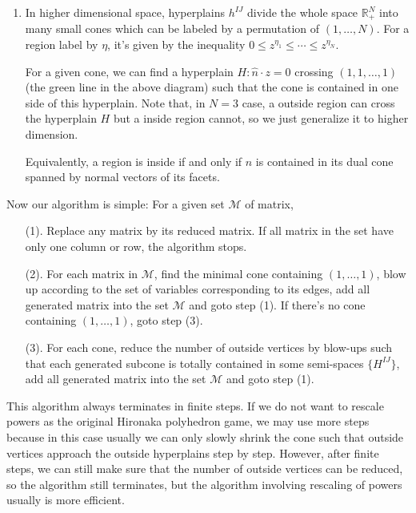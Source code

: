 \documentclass[12pt]{article}
\theoremstyle{definition}
\theoremstyle{plain}
\begin{document}
\begin{enumerate}
\item In higher dimensional space, hyperplains $h^{IJ}$ divide the whole space $\mathbb R_+^N$
	into many small cones which can be labeled by a permutation of $(1,\dots,N)$. 
	For a region label by $\eta$, it's given by the inequality 
	$0\leq z^{\eta_1}\leq \cdots\leq z^{\eta_N}$. 
	
	For a given cone, we can find a hyperplain $H:\hat{n}\cdot z=0$ crossing
	$(1,1,\dots,1)$ (the green line in the above diagram) 
	such that the cone is contained in one side of this hyperplain.
	Note that, in $N=3$ case, a outside region can cross the hyperplain $H$ 
	but a inside region cannot, so we just generalize it to higher dimension.

	Equivalently, a region is inside if and only if $\hat{n}$ is contained in 
	its dual cone spanned by normal vectors of its facets.
\end{enumerate}
%
Now our algorithm is simple: For a given set $\mathcal M$ of matrix,
\begin{enumerate}
	\item[(1).] Replace any matrix by its reduced matrix. If all matrix in the set
	have only one column or row, the algorithm stops.
	\item[(2).] For each matrix in $\mathcal M$, 
		find the minimal cone containing $(1,\dots,1)$, blow up according to
		the set of variables corresponding to its edges, 
		add all generated matrix into the set $\mathcal M$ and goto step (1).
		If there's no cone containing $(1,\dots,1)$, goto step (3).
	\item[(3).] For each cone, reduce the number of outside vertices by blow-ups 
		such that each generated subcone is totally contained in some semi-spaces 
		$\{H^{IJ}\}$, 
		add all generated matrix into the set $\mathcal M$ and goto step (1).
\end{enumerate}

This algorithm always terminates in finite steps. If we do not want to rescale powers
as the original Hironaka polyhedron game, we may use more steps because in this case 
usually we can only slowly shrink the cone such that outside vertices approach the outside 
hyperplains step by step. However, after finite steps, we can still make sure that 
the number of outside vertices can be reduced, so the algorithm still terminates, but
the algorithm involving rescaling of powers usually is more efficient.
\end{document}
